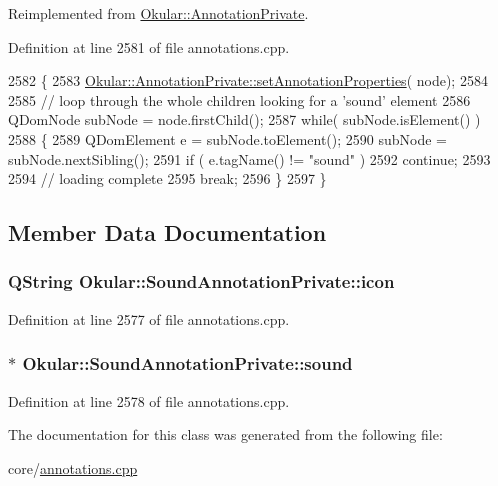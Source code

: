 Reimplemented from \hyperlink{classOkular_1_1AnnotationPrivate_a5fc7b450fa8c7e2717372e7394c3aa39}{Okular\+::\+Annotation\+Private}.



Definition at line 2581 of file annotations.\+cpp.


\begin{DoxyCode}
2582 \{
2583     \hyperlink{classOkular_1_1AnnotationPrivate_a5fc7b450fa8c7e2717372e7394c3aa39}{Okular::AnnotationPrivate::setAnnotationProperties}(
      node);
2584 
2585     \textcolor{comment}{// loop through the whole children looking for a 'sound' element}
2586     QDomNode subNode = node.firstChild();
2587     \textcolor{keywordflow}{while}( subNode.isElement() )
2588     \{
2589         QDomElement e = subNode.toElement();
2590         subNode = subNode.nextSibling();
2591         \textcolor{keywordflow}{if} ( e.tagName() != \textcolor{stringliteral}{"sound"} )
2592             \textcolor{keywordflow}{continue};
2593 
2594         \textcolor{comment}{// loading complete}
2595         \textcolor{keywordflow}{break};
2596     \}
2597 \}
\end{DoxyCode}


\subsection{Member Data Documentation}
\hypertarget{classOkular_1_1SoundAnnotationPrivate_abb28ae969447ed83b167d0436739e07a}{
\subsubsection[{icon}]{\setlength{\rightskip}{0pt plus 5cm}Q\+String Okular\+::\+Sound\+Annotation\+Private\+::icon}}\label{classOkular_1_1SoundAnnotationPrivate_abb28ae969447ed83b167d0436739e07a}


Definition at line 2577 of file annotations.\+cpp.

\hypertarget{classOkular_1_1SoundAnnotationPrivate_ad2d545e1fae26bc98d931ebb4c21079a}{
\subsubsection[{sound}]{$\ast$ Okular\+::\+Sound\+Annotation\+Private\+::sound}}\label{classOkular_1_1SoundAnnotationPrivate_ad2d545e1fae26bc98d931ebb4c21079a}


Definition at line 2578 of file annotations.\+cpp.



The documentation for this class was generated from the following file\+:\begin{DoxyCompactItemize}
\item 
core/\hyperlink{annotations_8cpp}{annotations.\+cpp}\end{DoxyCompactItemize}

